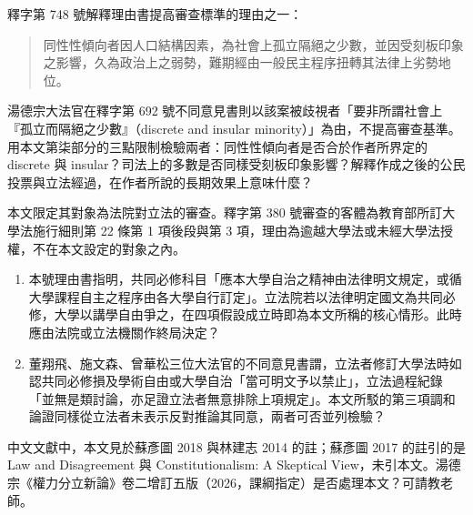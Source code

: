 
\begin{qaquestion}
釋字第 748 號解釋理由書提高審查標準的理由之一：
\begin{quote}
同性性傾向者因人口結構因素，為社會上孤立隔絕之少數，並因受刻板印象之影響，久為政治上之弱勢，難期經由一般民主程序扭轉其法律上劣勢地位。
\end{quote}
湯德宗大法官在釋字第 692 號不同意見書則以該案被歧視者「要非所謂社會上『孤立而隔絕之少數』（discrete and insular minority）」為由，不提高審查基準。用本文第柒部分的三點限制檢驗兩者：同性性傾向者是否合於作者所界定的 discrete 與 insular？司法上的多數是否同樣受刻板印象影響？解釋作成之後的公民投票與立法經過，在作者所說的長期效果上意味什麼？
\end{qaquestion}


\begin{qaquestion}
本文限定其對象為法院對立法的審查。釋字第 380 號審查的客體為教育部所訂大學法施行細則第 22 條第 1 項後段與第 3 項，理由為逾越大學法或未經大學法授權，不在本文設定的對象之內。
\begin{enumerate}
\item 本號理由書指明，共同必修科目「應本大學自治之精神由法律明文規定，或循大學課程自主之程序由各大學自行訂定」。立法院若以法律明定國文為共同必修，大學以講學自由爭之，在四項假設成立時即為本文所稱的核心情形。此時應由法院或立法機關作終局決定？
\item 董翔飛、施文森、曾華松三位大法官的不同意見書謂，立法者修訂大學法時如認共同必修損及學術自由或大學自治「當可明文予以禁止」，立法過程紀錄「並無是類討論，亦足證立法者無意排除上項規定」。本文所駁的第三項調和論證同樣從立法者未表示反對推論其同意，兩者可否並列檢驗？
\end{enumerate}
\end{qaquestion}


\begin{qaquestion}
中文文獻中，本文見於蘇彥圖 2018 與林建志 2014 的註；蘇彥圖 2017 的註引的是 Law and Disagreement 與 Constitutionalism: A Skeptical View，未引本文。湯德宗《權力分立新論》卷二增訂五版（2026，課綱指定）是否處理本文？可請教老師。
\end{qaquestion}
